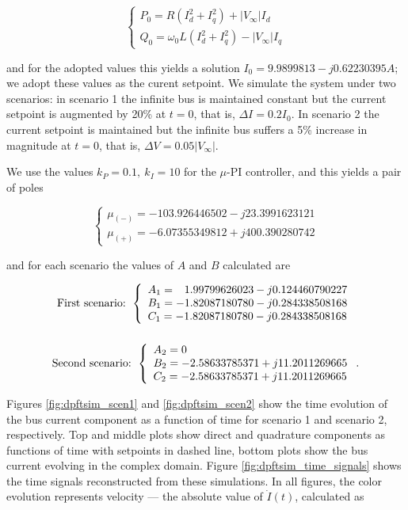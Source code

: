 \begin{equation}
	\left\{\begin{array}{l}
		P_0 = R\left(I_d^2 + I_q^2\right) + \left\lvert V_\infty\right\rvert I_d \\[5mm]
		Q_0 = \omega_0 L\left(I_d^2 + I_q^2\right) - \left\lvert V_\infty\right\rvert I_q
	\end{array}\right.
\end{equation}

	\noindent and for the adopted values this yields a solution $I_0 = 9.9899813 - j0.62230395A$; we adopt these values as the curent setpoint. We simulate the system under two scenarios: in scenario 1 the infinite bus is maintained constant but the current setpoint is augmented by 20\% at $t = 0$, that is, $\Delta I = 0.2 I_0$. In scenario 2 the current setpoint is maintained but the infinite bus suffers a 5\% increase in magnitude at $t = 0$, that is, $\Delta V = 0.05 \left\lvert V_\infty\right\rvert$.

	We use the values $k_P = 0.1,\ k_I = 10$ for the $\mu$-PI controller, and this yields a pair of poles

\begin{equation}\left\{\begin{array}{l} \mu_{(-)} = -103.926446502 - j23.3991623121\\ \mu_{(+)} = -6.07355349812 + j400.390280742 \end{array}\right.\end{equation}

	\noindent and for each scenario the values of $A$ and $B$ calculated are

\begin{gather} \text{First scenario: }\left\{\begin{array}{l} A_1 = \hphantom{-}1.99799626023 - j0.124460790227 \\ B_1 = -1.82087180780 - j0.284338508168 \\  C_1 = -1.82087180780 - j0.284338508168 \end{array}\right.\\[5mm] \text{Second scenario: }\left\{\begin{array}{l} A_2 = 0 \\ B_2 = -2.58633785371 + j11.2011269665 \\ C _2= -2.58633785371 + j11.2011269665\end{array}\right. .\end{gather}

	Figures \ref{fig:dpftsim_scen1} and \ref{fig:dpftsim_scen2} show the time evolution of the bus current component as a function of time for scenario 1 and scenario 2, respectively. Top and middle plots show direct and quadrature components as functions of time with setpoints in dashed line, bottom plots show the bus current evolving in the complex domain. Figure \ref{fig:dpftsim_time_signals} shows the time signals reconstructed from these simulations. In all figures, the color evolution represents velocity — the absolute value of $\dot{I}(t)$, calculated as

